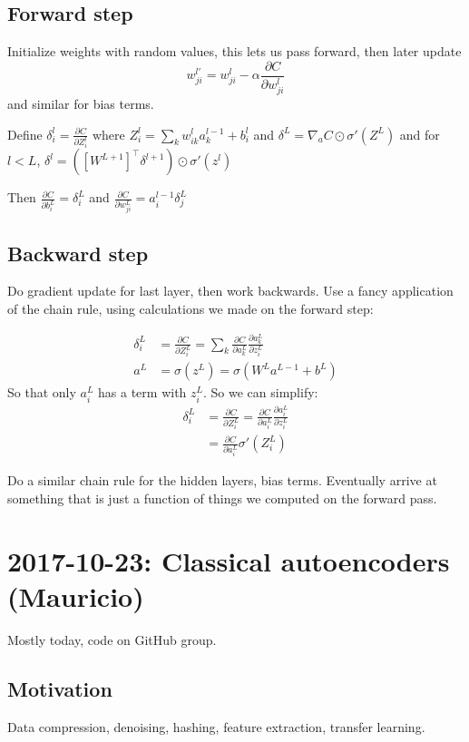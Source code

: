 \documentclass{article}
\begin{document}
\subsection{Forward step}
Initialize weights with random values, this lets us pass forward, then later update
\begin{equation*}
  w_{ji}^{l'}=w_{ji}^l - \alpha \frac{\partial C}{\partial{w_{ji}^l}}
\end{equation*}
and similar for bias terms.

Define $\delta_i^l=\frac{\partial C}{\partial Z_i^l}$ where $Z_i^l=\sum_k w_{ik}^l a^{l-1}_k+b_i^l$
and $\delta^L=\nabla_a C\odot \sigma'(Z^L)$ and for $l<L$, $\delta^l=\left( \left[ W^{L+1} \right]^\top \delta^{l+1} \right) \odot \sigma'(z^l)$

Then $\frac{\partial C}{\partial b_i^L} = \delta_i^L$ and $\frac{\partial C}{\partial w_{ji}^L} = a_i^{l-1}\delta_j^L$

\subsection{Backward step}
Do gradient update for last layer, then work backwards. Use a fancy application of the chain rule, using
calculations we made on the forward step:

\begin{align*}
  \delta_i^L&=\frac{\partial C}{\partial Z_i^L}=\sum_k \frac{\partial C}{\partial a_k^L} \frac{\partial a_k^L}{\partial z_i^L}
  \\
  a^L&=\sigma(z^L)=\sigma(W^L a^{L-1} + b^L)
\end{align*}
So that only $a_i^L$ has a term with $z_i^L$.
So we can simplify:
\begin{align*}
  \delta_i^L&=\frac{\partial C}{\partial Z_i^L}=\frac{\partial C}{\partial a_i^L} \frac{\partial a_i^L}{\partial z_i^L}
  \\
  &= \frac{\partial C}{\partial a_i^L} \sigma'(Z_i^L)
\end{align*}

Do a similar chain rule for the hidden layers, bias terms. Eventually arrive at something that is just a function of
things we computed on the forward pass.

\section{2017-10-23: Classical autoencoders (Mauricio)}
Mostly today, code on GitHub group.

\subsection{Motivation}
Data compression, denoising, hashing, feature extraction, transfer learning.
\end{document}
